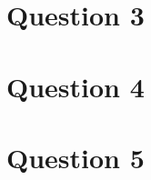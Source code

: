 \documentclass[12pt]{article}
\begin{document}
\section*{Question 3}

\section*{Question 4}

\section*{Question 5}
\end{document}
